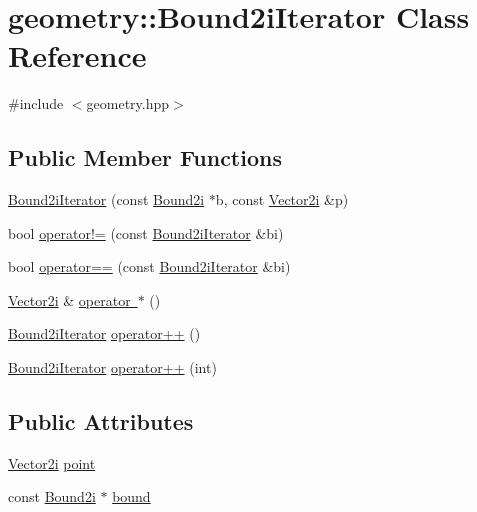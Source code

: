 \hypertarget{classgeometry_1_1Bound2iIterator}{}\section{geometry\+::Bound2i\+Iterator Class Reference}
\label{classgeometry_1_1Bound2iIterator}


{\ttfamily \#include $<$geometry.\+hpp$>$}

\subsection*{Public Member Functions}
\begin{DoxyCompactItemize}
\item 
\mbox{\hyperlink{classgeometry_1_1Bound2iIterator_adcaf8210b4c30af0f2345a71e320cfab}{Bound2i\+Iterator}} (const \mbox{\hyperlink{namespacegeometry_a918a919c0a947983a121b11e5c64934f}{Bound2i}} $\ast$b, const \mbox{\hyperlink{cyclop_8hpp_ac9c6c66d543f1c0c5bc66579727dae30}{Vector2i}} \&p)
\item 
bool \mbox{\hyperlink{classgeometry_1_1Bound2iIterator_a1cc5b6500742648970b82c31912f1e53}{operator!=}} (const \mbox{\hyperlink{classgeometry_1_1Bound2iIterator}{Bound2i\+Iterator}} \&bi)
\item 
bool \mbox{\hyperlink{classgeometry_1_1Bound2iIterator_ad9c8bdd11dae51aa48ee8af840b75356}{operator==}} (const \mbox{\hyperlink{classgeometry_1_1Bound2iIterator}{Bound2i\+Iterator}} \&bi)
\item 
\mbox{\hyperlink{cyclop_8hpp_ac9c6c66d543f1c0c5bc66579727dae30}{Vector2i}} \& \mbox{\hyperlink{classgeometry_1_1Bound2iIterator_ac6dc53448f0595fa1269bf47c3a96b19}{operator $\ast$}} ()
\item 
\mbox{\hyperlink{classgeometry_1_1Bound2iIterator}{Bound2i\+Iterator}} \mbox{\hyperlink{classgeometry_1_1Bound2iIterator_a9f269f3b65c55d130a0ae56b44d5dd6c}{operator++}} ()
\item 
\mbox{\hyperlink{classgeometry_1_1Bound2iIterator}{Bound2i\+Iterator}} \mbox{\hyperlink{classgeometry_1_1Bound2iIterator_a9130ee460c4cbbc77e836867b1f07757}{operator++}} (int)
\end{DoxyCompactItemize}
\subsection*{Public Attributes}
\begin{DoxyCompactItemize}
\item 
\mbox{\hyperlink{cyclop_8hpp_ac9c6c66d543f1c0c5bc66579727dae30}{Vector2i}} \mbox{\hyperlink{classgeometry_1_1Bound2iIterator_a5ea8d0f03b3ee6e47863a12af0e1dfaf}{point}}
\item 
const \mbox{\hyperlink{namespacegeometry_a918a919c0a947983a121b11e5c64934f}{Bound2i}} $\ast$ \mbox{\hyperlink{classgeometry_1_1Bound2iIterator_a2ab12faa3546d009f05f088889a40c46}{bound}}
\end{DoxyCompactItemize}


